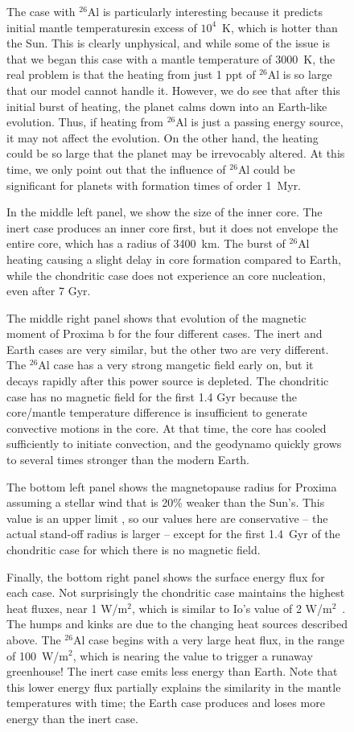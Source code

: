 \documentclass[preprint,12pt]{aastex}
\begin{document}
\begin{figure}
The case with $^{26}$Al is particularly interesting because it
predicts initial mantle temperaturesin excess of $10^4$~K, which is
hotter than the Sun. This is clearly unphysical, and while some of the
issue is that we began this case with a mantle temperature of 3000~K,
the real problem is that the heating from just 1 ppt of $^{26}$Al is
so large that our model cannot handle it. However, we do see that
after this initial burst of heating, the planet calms down into an
Earth-like evolution. Thus, if heating from $^{26}$Al is just a
passing energy source, it may not affect the evolution. On the other
hand, the heating could be so large that the planet may be irrevocably
altered. At this time, we only point out that the influence of
$^{26}$Al could be significant for planets with formation times of
order 1~Myr.

In the middle left panel, we show the size of the inner core. The
inert case produces an inner core first, but it does not envelope the
entire core, which has a radius of 3400~km. The burst of $^{26}$Al
heating causing a slight delay in core formation compared to Earth,
while the chondritic case does not experience an core nucleation, even
after 7 Gyr.

The middle right panel shows that evolution of the magnetic moment of
Proxima b for the four different cases. The inert and Earth cases are
very similar, but the other two are very different. The $^{26}$Al case
has a very strong mangetic field early on, but it decays rapidly after
this power source is depleted. The chondritic case has no magnetic
field for the first 1.4 Gyr because the core/mantle temperature
difference is insufficient to generate convective motions in the
core. At that time, the core has cooled sufficiently to initiate
convection, and the geodynamo quickly grows to several times stronger
than the modern Earth.

The bottom left panel shows the magnetopause radius for Proxima
assuming a stellar wind that is 20\% weaker than the Sun's. This value
is an upper limit \citep{Wood01}, so our values here are conservative
-- the actual stand-off radius is larger -- except for the first
1.4~Gyr of the chondritic case for which there is no magnetic field.

Finally, the bottom right panel shows the surface energy flux for each
case. Not surprisingly the chondritic case maintains the highest heat
fluxes, near 1 W/m$^2$, which is similar to Io's value of 2
W/m$^2$~\citep{Veeder94}. The humps and kinks are due to the changing
heat sources described above. The $^{26}$Al case begins with a very
large heat flux, in the range of 100~W/m$^2$, which is nearing the
value to trigger a runaway greenhouse! The inert case emits less
energy than Earth. Note that this lower energy flux partially explains
the similarity in the mantle temperatures with time; the Earth case
produces and loses more energy than the inert case.


\end{figure}
\end{document}
